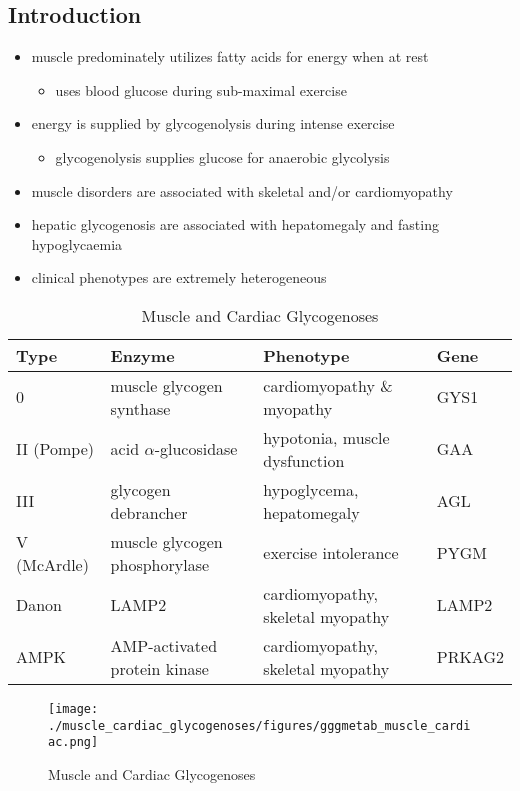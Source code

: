 \documentclass{scrartcl}
\begin{document}
\subsection{Introduction}
\label{sec:orgb33a016}
\begin{itemize}
\item muscle predominately utilizes fatty acids for energy when at rest
\begin{itemize}
\item uses blood glucose during sub-maximal exercise
\end{itemize}
\item energy is supplied by glycogenolysis during intense exercise
\begin{itemize}
\item glycogenolysis supplies glucose for anaerobic glycolysis
\end{itemize}
\item muscle disorders are associated with skeletal and/or
cardiomyopathy
\item hepatic glycogenosis are associated with hepatomegaly and fasting
hypoglycaemia
\item clinical phenotypes are extremely heterogeneous
\end{itemize}

\begin{table}[htbp]
\caption{\label{tab:org1db7508}
Muscle and Cardiac Glycogenoses}
\centering
\begin{tabular}{llll}
Type & Enzyme & Phenotype & Gene\\
\hline
0 & muscle glycogen synthase & cardiomyopathy \& myopathy & GYS1\\
II (Pompe) & acid \(\alpha\)-glucosidase & hypotonia, muscle dysfunction & GAA\\
III & glycogen debrancher & hypoglycema, hepatomegaly & AGL\\
V (McArdle) & muscle glycogen phosphorylase & exercise intolerance & PYGM\\
Danon & LAMP2 & cardiomyopathy, \textpm{} skeletal myopathy & LAMP2\\
AMPK & AMP-activated protein kinase & cardiomyopathy, \textpm{} skeletal myopathy & PRKAG2\\
\end{tabular}
\end{table}

\begin{figure}[htbp]
\centering
\texttt{[image: ./muscle\_cardiac\_glycogenoses/figures/gggmetab\_muscle\_cardiac.png]}
\caption[Muscle and Cardiac Glycogenoses]{\label{fig:orgbc16898}
Muscle and Cardiac Glycogenoses}
\end{figure}
\end{document}
